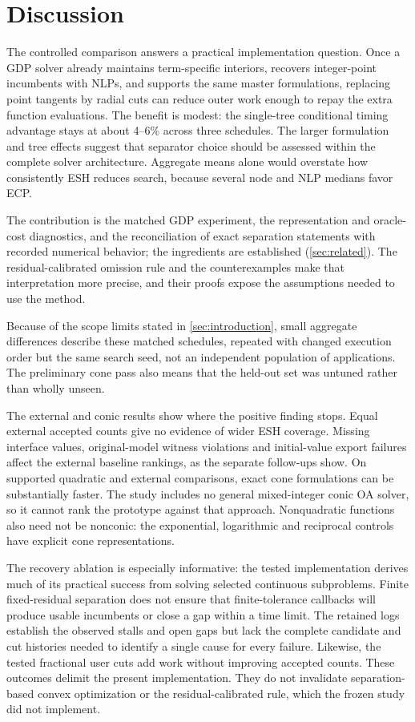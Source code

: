 \section{Discussion}\label{sec:discussion}
The controlled comparison answers a practical implementation question. Once a GDP solver already maintains term-specific interiors, recovers integer-point incumbents with NLPs, and supports the same master formulations, replacing point tangents by radial cuts can reduce outer work enough to repay the extra function evaluations. The benefit is modest: the single-tree conditional timing advantage stays at about 4--6\% across three schedules. The larger formulation and tree effects suggest that separator choice should be assessed within the complete solver architecture. Aggregate means alone would overstate how consistently ESH reduces search, because several node and NLP medians favor ECP.

The contribution is the matched GDP experiment, the representation and oracle-cost diagnostics, and the reconciliation of exact separation statements with recorded numerical behavior; the ingredients are established (\cref{sec:related}). The residual-calibrated omission rule and the counterexamples make that interpretation more precise, and their proofs expose the assumptions needed to use the method.

Because of the scope limits stated in \cref{sec:introduction}, small aggregate differences describe these matched schedules, repeated with changed execution order but the same search seed, not an independent population of applications. The preliminary cone pass also means that the held-out set was untuned rather than wholly unseen.

The external and conic results show where the positive finding stops. Equal external accepted counts give no evidence of wider ESH coverage. Missing interface values, original-model witness violations and initial-value export failures affect the external baseline rankings, as the separate follow-ups show. On supported quadratic and external comparisons, exact cone formulations can be substantially faster. The study includes no general mixed-integer conic OA solver, so it cannot rank the prototype against that approach. Nonquadratic functions also need not be nonconic: the exponential, logarithmic and reciprocal controls have explicit cone representations.

The recovery ablation is especially informative: the tested implementation derives much of its practical success from solving selected continuous subproblems. Finite fixed-residual separation does not ensure that finite-tolerance callbacks will produce usable incumbents or close a gap within a time limit. The retained logs establish the observed stalls and open gaps but lack the complete candidate and cut histories needed to identify a single cause for every failure. Likewise, the tested fractional user cuts add work without improving accepted counts. These outcomes delimit the present implementation. They do not invalidate separation-based convex optimization or the residual-calibrated rule, which the frozen study did not implement.

